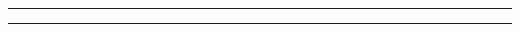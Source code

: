 \documentclass[portrait,a4paper]{article} %
\begin{document}

  
\hrule     
\vspace{.5cm}
\begin{multicols}{2}
    \begin{description}[labelindent=0.2cm,leftmargin=2.3cm,style=nextline]
        \item[\textsc{Studente}:] \studentA
        \item[\textsc{Email}:]\emailA
\vspace{1cm}
        \item[\textsc{Studente}:] \studentB
        \item[\textsc{Email}:]\emailB
\vspace{1cm}
        \item[\textsc{Studente}:] \studentC
        \item[\textsc{Email}:]\emailC
\vspace{1cm}
        \item[\textsc{Studente}:] \studentD
        \item[\textsc{Email}:]\emailD

    \end{description}
\end{multicols}
\vspace{.5cm}
\hrule        
\vspace{.5cm} 

\clearpage

\newpage
\renewcommand*\contentsname{Sommario}

\tableofcontents

\newpage
{}
\end{document}
